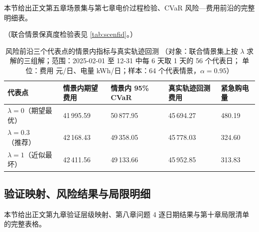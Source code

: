 本节给出正文第五章场景集与第七章电价过程检验、CVaR 风险—费用前沿的完整明细表。

（联合情景保真度检验表见 \ref{tab:scenfid}。）



\begin{table}[htbp]
  \centering
  \caption{风险前沿三个代表点的情景内指标与真实轨迹回测
           （对象：联合情景集上按 \(\lambda\) 求解的三组解；范围：2025-02-01 至 12-31 中每 6 天取 1 天的 56 个代表日；
            单位：费用 元/日、电量 kWh/日；样本：64 个代表情景，\(\alpha=0.95\)）}
  \label{tab:frontier-backtest}
  \footnotesize
  \setlength{\tabcolsep}{4pt}
  \begin{tabularx}{\linewidth}{L{3.0cm} C{2.3cm} C{2.3cm} C{2.5cm} Y}
    \toprule
    代表点 & 情景内期望费用 & 情景内 95\% CVaR & 真实轨迹回测费用 & 紧急购电量 \\
    \midrule
    \(\lambda=0\)（期望最优） & 41\,995.59 & 50\,877.95 & 45\,694.27 & 480.19 \\
    \(\lambda=0.3\)（推荐） & 42\,168.43 & 49\,358.05 & 45\,778.03 & 324.60 \\
    \(\lambda=1\)（近似最坏） & 42\,411.56 & 49\,133.66 & 45\,952.85 & 313.83 \\
    \bottomrule
  \end{tabularx}
\end{table}

\subsection{验证映射、风险结果与局限明细}

本节给出正文第九章验证层级映射、第八章问题 4 逐日期结果与第十章局限清单的完整表格。


